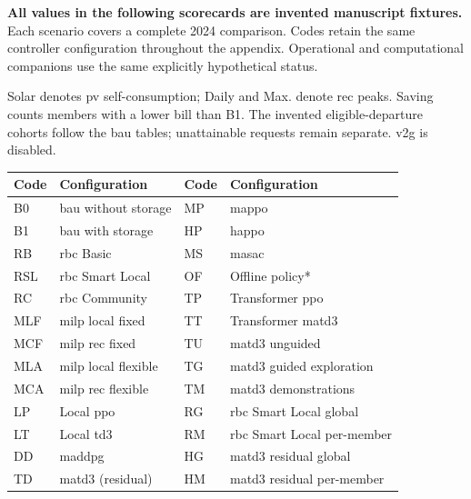 \noindent\textbf{All values in the following scorecards are invented manuscript fixtures.} Each scenario covers a complete 2024 comparison. Codes retain the same controller configuration throughout the appendix. Operational and computational companions use the same explicitly hypothetical status.
\par Solar denotes \gls{pv} self-consumption; Daily and Max. denote \gls{rec} peaks. Saving counts members with a lower bill than B1. The invented eligible-departure cohorts follow the \gls{bau} tables; unattainable requests remain separate. \gls{v2g} is disabled.
\par\medskip\noindent\begin{minipage}{\textwidth}\singlespacing\footnotesize\begin{tabularx}{\textwidth}{@{}lXlX@{}}\toprule Code & Configuration & Code & Configuration\\\midrule
B0 & \gls{bau} without storage & MP & \gls{mappo}\\
B1 & \gls{bau} with storage & HP & \gls{happo}\\
RB & \gls{rbc} Basic & MS & \gls{masac}\\
RSL & \gls{rbc} Smart Local & OF & Offline policy*\\
RC & \gls{rbc} Community & TP & Transformer \gls{ppo}\\
MLF & \gls{milp} local fixed & TT & Transformer \gls{matd3}\\
MCF & \gls{milp} \gls{rec} fixed & TU & \gls{matd3} unguided\\
MLA & \gls{milp} local flexible & TG & \gls{matd3} guided exploration\\
MCA & \gls{milp} \gls{rec} flexible & TM & \gls{matd3} demonstrations\\
LP & Local \gls{ppo} & RG & \gls{rbc} Smart Local global\\
LT & Local \gls{td3} & RM & \gls{rbc} Smart Local per-member\\
DD & \gls{maddpg} & HG & \gls{matd3} residual global\\
TD & \gls{matd3} (residual) & HM & \gls{matd3} residual per-member\\
\bottomrule\end{tabularx}\end{minipage}
\clearpage
